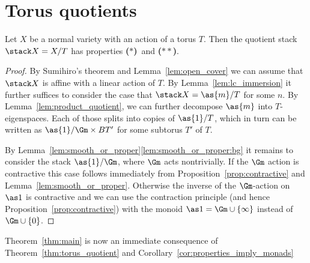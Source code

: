 \documentclass{ck-article}
\newcommand\bc{\textbf{($\mathbf{*}$)}}
\newcommand\hbc{\textbf{($\mathbf{**}$)}}
\begin{document}
\section{Torus quotients}\label{sec:torus}

\begin{Thm}\label{thm:torus_quotient}
    Let $X$ be a normal variety with an action of a torus $T$.
    Then the quotient stack $\stack X = X/T$ has properties \bc\ and \hbc.
\end{Thm}

\begin{proof}
  By Sumihiro's theorem \cite{Sumihiro:1974:EquivariantCompletions} and Lemma~\ref{lem:open_cover} we can assume that $\stack X$ is affine with a linear action of $T$.
  By Lemma~\ref{lem:lc_immersion} it further suffices to consider the case that $\stack X = \as{m}/T$ for some $n$.
  By Lemma~\ref{lem:product_quotient}, we can further decompose $\as{m}$ into $T$-eigenspaces.
  Each of those splits into copies of $\as{1}/T$, which in turn can be written as $\as{1}/\Gm \times BT'$ for some subtorus $T'$ of $T$.
  
  By Lemma~\ref{lem:smooth_or_proper}\ref{lem:smooth_or_proper:bg} it remains to consider the stack $\as{1}/\Gm$, where $\Gm$ acts nontrivially.
  If the $\Gm$ action is contractive this case follows immediately from Proposition~\ref{prop:contractive} and Lemma~\ref{lem:smooth_or_proper}.
  Otherwise the inverse of the $\Gm$-action on $\as1$ is contractive and we can use the contraction principle (and hence Proposition~\ref{prop:contractive}) with the monoid $\as1 = \Gm \cup \{\infty\}$ instead of $\Gm \cup \{0\}$.
\end{proof}

Theorem~\ref{thm:main} is now an immediate consequence of Theorem~\ref{thm:torus_quotient} and Corollary~\ref{cor:properties_imply_monads}
\end{document}
